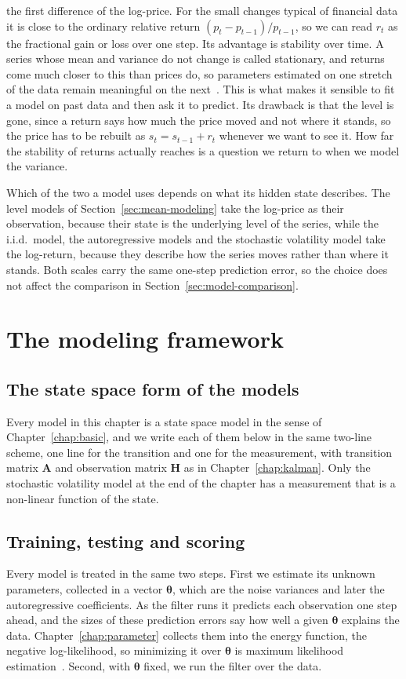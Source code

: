the first difference of the log-price. For the small changes typical of financial data it is close to the ordinary relative return $(p_t - p_{t-1})/p_{t-1}$, so we can read $r_t$ as the fractional gain or loss over one step. Its advantage is stability over time. A series whose mean and variance do not change is called stationary, and returns come much closer to this than prices do, so parameters estimated on one stretch of the data remain meaningful on the next~\cite[Ch.~2]{palomar:portfolio_optimization}. This is what makes it sensible to fit a model on past data and then ask it to predict. Its drawback is that the level is gone, since a return says how much the price moved and not where it stands, so the price has to be rebuilt as $s_t = s_{t-1} + r_t$ whenever we want to see it. How far the stability of returns actually reaches is a question we return to when we model the variance.

Which of the two a model uses depends on what its hidden state describes. The level models of Section~\ref{sec:mean-modeling} take the log-price as their observation, because their state is the underlying level of the series, while the i.i.d.\ model, the autoregressive models and the stochastic volatility model take the log-return, because they describe how the series moves rather than where it stands. Both scales carry the same one-step prediction error, so the choice does not affect the comparison in Section~\ref{sec:model-comparison}. 

\section{The modeling framework}\label{sec:framework}

\subsection{The state space form of the models}
Every model in this chapter is a state space model in the sense of Chapter~\ref{chap:basic}, and we write each of them below in the same two-line scheme, one line for the transition and one for the measurement, with transition matrix $\mathbf{A}$ and observation matrix $\mathbf{H}$ as in Chapter~\ref{chap:kalman}. Only the stochastic volatility model at the end of the chapter has a measurement that is a non-linear function of the state.

\subsection{Training, testing and scoring}
Every model is treated in the same two steps. First we estimate its unknown parameters, collected in a vector $\boldsymbol{\theta}$, which are the noise variances and later the autoregressive coefficients. As the filter runs it predicts each observation one step ahead, and the sizes of these prediction errors say how well a given $\boldsymbol{\theta}$ explains the data. Chapter~\ref{chap:parameter} collects them into the energy function, the negative log-likelihood, so minimizing it over $\boldsymbol{\theta}$ is maximum likelihood estimation~\cite[Ch.~12]{sarkka:bayesian_filtering}. Second, with $\boldsymbol{\theta}$ fixed, we run the filter over the data.

